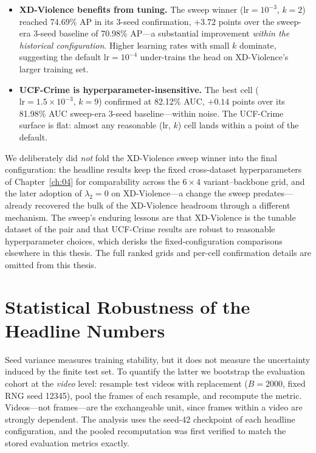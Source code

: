 \begin{itemize}
    \item \textbf{XD-Violence benefits from tuning.} The sweep winner
    ($\mathrm{lr}=10^{-3}$, $k=2$) reached 74.69\% AP in its 3-seed
    confirmation, $+3.72$ points over the sweep-era 3-seed baseline of
    70.98\% AP---a substantial improvement \emph{within the historical
    configuration}. Higher learning rates with small $k$ dominate,
    suggesting the default $\mathrm{lr}=10^{-4}$ under-trains the head on
    XD-Violence's larger training set.
    \item \textbf{UCF-Crime is hyperparameter-insensitive.} The best cell
    ($\mathrm{lr}=1.5\times10^{-3}$, $k=9$) confirmed at 82.12\% AUC,
    $+0.14$ points over its 81.98\% AUC sweep-era 3-seed baseline---within
    noise. The UCF-Crime surface is flat: almost any reasonable
    (lr, $k$) cell lands within a point of the default.
\end{itemize}

We deliberately did \emph{not} fold the XD-Violence sweep winner into the
final configuration: the headline results keep the fixed cross-dataset
hyperparameters of Chapter~\ref{ch:04} for comparability across the
$6\times4$ variant--backbone grid, and the later adoption of $\lambda_2=0$ on
XD-Violence---a change the sweep predates---already recovered the bulk of the
XD-Violence headroom through a different mechanism. The sweep's enduring
lessons are that XD-Violence is the tunable dataset of the pair and that
UCF-Crime results are robust to reasonable hyperparameter choices, which
derisks the fixed-configuration comparisons elsewhere in this thesis. The full
ranked grids and per-cell confirmation details are omitted from this thesis.

\section{Statistical Robustness of the Headline Numbers}
\label{sec:bootstrap}

Seed variance measures training stability, but it does not measure the
uncertainty induced by the finite test set. To quantify the latter we
bootstrap the evaluation cohort at the \emph{video} level: resample test
videos with replacement ($B=2000$, fixed RNG seed 12345), pool the frames of
each resample, and recompute the metric. Videos---not frames---are the
exchangeable unit, since frames within a video are strongly dependent. The
analysis uses the seed-42 checkpoint of each headline configuration, and the
pooled recomputation was first verified to match the stored evaluation
metrics exactly.

